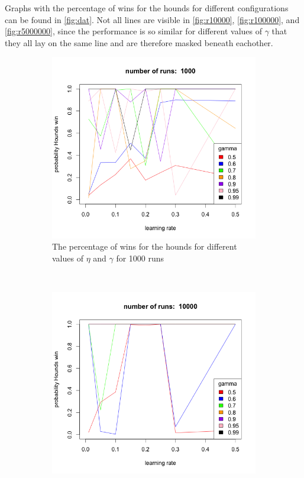 
Graphs with the percentage of wins for the hounds for different
configurations can be found in \autoref{fig:dat}. Not all lines are visible
in \autoref{fig:r10000}, \autoref{fig:r100000}, and \autoref{fig:r5000000},
since the performance is so similar for different values of $\gamma$ that
they all lay on the same line and are therefore masked beneath eachother.

\begin{figure}[bt]
    \centering
    \begin{subfigure}{0.49\textwidth}
        \includegraphics[width=\textwidth]{r1000}
        \caption{The percentage of wins for the hounds for different values
            of $\eta$ and $\gamma$ for 1000 runs}
        \label{fig:r1000}
    \end{subfigure}
    ~
    \begin{subfigure}{0.49\textwidth}
        \includegraphics[width=\textwidth]{r10000}

\end{subfigure}
\end{figure}
